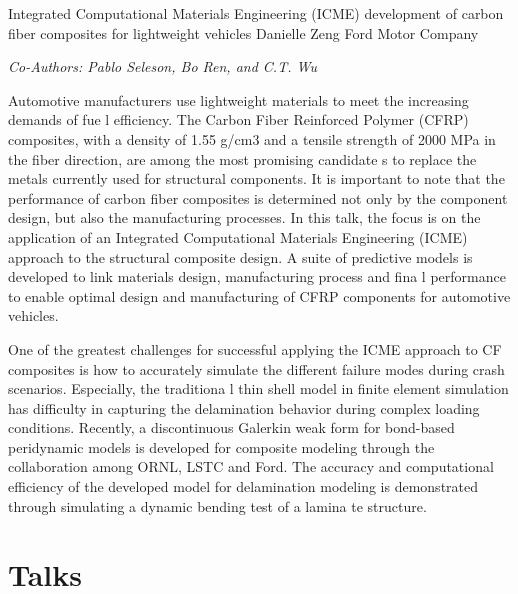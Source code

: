 \documentclass[12pt]{book}
\newenvironment{conf-abstract}[4][]{
  \needspace{10\baselineskip}
  \begin{center}
    { \renewcommand\textsuperscript[1]{}
      \phantomsection\addcontentsline{toc}{section}
      {\texorpdfstring{#2 (\emph{#3})}{#2 (#3)}}
    }
    {{\large\bfseries #2}\marginnote{#1}\par}
    \medskip
    {#3\par}
    \smallskip
    {\small #4\par}
  \end{center}
}{%
  \bigskip
  \hrule
  \bigskip
}
\newcommand{\indexauthors}[1]{%
  \forcsvlist{\index}{#1}
}
\begin{document}
\begin{conf-abstract}[27$^{th}$]
{Integrated Computational Materials Engineering (ICME) development of carbon fiber composites for lightweight vehicles}
{Danielle Zeng}
{Ford Motor Company}
\indexauthors{Zeng!Danielle}
\begin{center}
\textit{Co-Authors: Pablo Seleson, Bo Ren, and C.T. Wu}
\end{center}
Automotive   manufacturers  use  lightweight   materials  to  meet  the  increasing   demands  of  fue l efficiency.  The Carbon Fiber  Reinforced  Polymer  (CFRP) composites,  with  a density  of 1.55  g/cm3 and  a tensile  strength  of 2000  MPa in  the fiber  direction,  are among  the most  promising  candidate s  to  replace  the  metals  currently  used  for  structural  components.  It  is  important  to  note  that  the  performance  of  carbon  fiber  composites  is  determined  not  only  by  the  component  design,  but  also the  manufacturing   processes.  In  this   talk,   the  focus  is  on   the  application   of  an  Integrated Computational  Materials  Engineering  (ICME) approach  to  the structural  composite  design.  A suite  of  predictive   models   is  developed   to  link   materials   design,   manufacturing   process  and  fina l performance  to  enable  optimal   design  and  manufacturing   of  CFRP  components  for  automotive  vehicles.

One of the greatest challenges  for successful applying  the ICME approach  to CF composites  is  how  to  accurately simulate  the different  failure  modes  during  crash scenarios.  Especially,  the traditiona l thin  shell  model  in  finite  element  simulation  has  difficulty  in  capturing  the  delamination  behavior during  complex  loading  conditions.  Recently,  a discontinuous  Galerkin  weak form  for bond-based peridynamic  models  is developed  for composite  modeling  through  the collaboration  among  ORNL, LSTC  and   Ford.     The  accuracy  and   computational   efficiency   of  the  developed   model   for delamination   modeling   is  demonstrated  through  simulating   a dynamic  bending  test  of  a  lamina te  structure.
\end{conf-abstract}


\chapter{Talks}

{
\begin{conf-abstract}[\datum\\\tiny\time]
{\title}
{\first~ \last}
{\affiliation}
\indexauthors{\last!\first}

\newpage
\end{conf-abstract}
}
\end{document}
